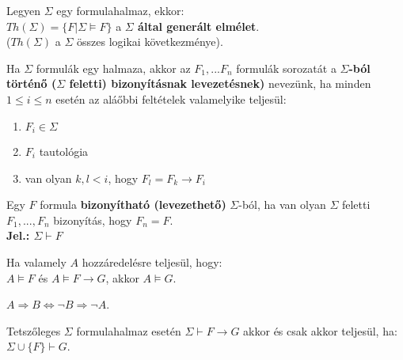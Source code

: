 \documentclass{beamer}
\newcommand{\msmallskip}{\vspace{0.3em}}
\newcommand{\mbigskip}{\vspace{1em}}
\begin{document}
\begin{frame}

\begin{tcolorbox}[title={Def.: Elmélet}]
Legyen $\Sigma$ egy formulahalmaz, ekkor:\\
\msmallskip
$Th({\Sigma}) = \{F | \Sigma \models F\}$ a \textbf{$\Sigma$ által generált elmélet}.\\
($Th({\Sigma})$ a $\Sigma$ összes logikai következménye).
\end{tcolorbox}

\begin{tcolorbox}[title={Def.: Levezetés, bizonyítható formula}]
Ha $\Sigma$ formulák egy halmaza, akkor az $F_1, ... F_n$ formulák sorozatát a \textbf{$\Sigma$-ból történő ($\Sigma$ feletti) bizonyításnak levezetésnek)} nevezünk, ha minden $1 \leq i \leq n$ esetén az aláőbbi feltételek valamelyike teljesül:\\
\begin{enumerate}
\item $F_i \in \Sigma$
\item $F_i$ tautológia
\item van olyan $k, l < i$, hogy $F_l = F_k \rightarrow F_i$
\end{enumerate}
\mbigskip
Egy $F$ formula \textbf{bizonyítható (levezethető)} $\Sigma$-ból, ha van olyan $\Sigma$ feletti $F_1, ..., F_n$ bizonyítás, hogy $F_n = F$.\\
\mbigskip
\textbf{Jel.: $\Sigma \vdash F$}
\end{tcolorbox}

\end{frame}

\begin{frame}

\begin{tcolorbox}[title={Def.: Modus Ponens}]
Ha valamely $A$ hozzáredelésre teljesül, hogy:\\
$A \models F$ és $A \models F \rightarrow G$, akkor $A \models G$.
\end{tcolorbox}

\begin{tcolorbox}[title={Def.: Modus Tollens (Kontrapozíció)}]
$A \Rightarrow B \iff {\neg}B \Rightarrow {\neg}A$.
\end{tcolorbox}

\begin{tcolorbox}[title={Def.: Indirekt Bizonyítás}]
Tetszőleges $\Sigma$ formulahalmaz esetén $\Sigma \vdash F \rightarrow G$ akkor és csak akkor teljesül, ha:\\
$\Sigma \cup \{F\} \vdash G$.
\end{tcolorbox}

\end{frame}
\end{document}
